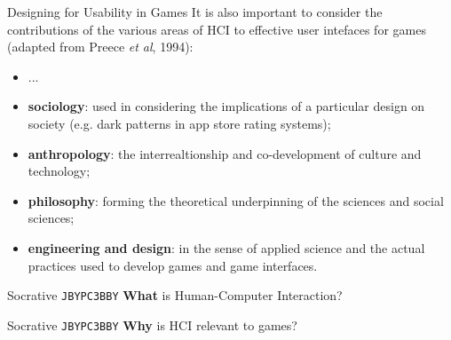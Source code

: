 \begin{frame}{Designing for Usability in Games}
	It is also important to consider the contributions of the various areas of HCI to effective user intefaces for games 
	(adapted from Preece \textit{et al}, 1994):

	\begin{itemize}
		\item ...
		
		\item \textbf{sociology}: used in considering the implications of a particular design on society (e.g. dark patterns in app store rating systems); \pause
		
		\item \textbf{anthropology}: the interrealtionship and co-development of culture and technology; \pause
		
		\item \textbf{philosophy}: forming the theoretical underpinning of the sciences and social sciences; \pause
		
		\item \textbf{engineering and design}: in the sense of applied science and the actual practices used to develop games and game interfaces.
	\end{itemize}
\end{frame}

\begin{frame}[fragile]{Socrative \texttt{JBYPC3BBY}}
    \textbf{What} is Human-Computer Interaction?
\end{frame}

\begin{frame}[fragile]{Socrative \texttt{JBYPC3BBY}}
    \textbf{Why} is HCI relevant to games?
\end{frame}